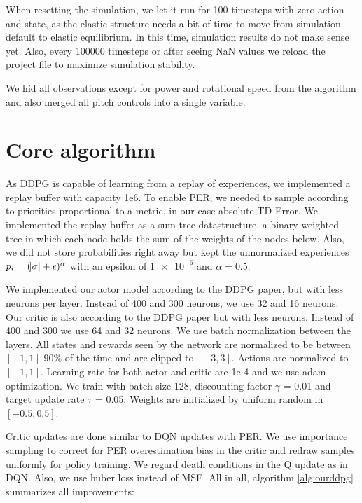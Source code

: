 \documentclass[hyperref,beleg]{cgvpub}
\begin{document}
When resetting the simulation, we let it run for 100 timesteps with zero action and state, as the elastic structure needs a bit of time to move from simulation default to elastic equilibrium. In this time, simulation results do not make sense yet. Also, every 100000 timesteps or after seeing NaN values we reload the project file to maximize simulation stability.

We hid all observations except for power and rotational speed from the algorithm and also merged all pitch controls into a single variable.

\section{Core algorithm}

As DDPG is capable of learning from a replay of experiences, we implemented a replay buffer with capacity 1e6. To enable \ac{PER}, we needed to sample according to priorities proportional to a metric, in our case absolute \ac{TD-Error}. We implemented the replay buffer as a sum tree datastructure, a binary weighted tree in which each node holds the sum of the weights of the nodes below.  Also, we did not store probabilities right away but kept the unnormalized experiences $p_i = (\abs{\sigma} + \epsilon)^{\alpha}$ with an epsilon of $\num{1e-6}$ and $\alpha = 0.5$. 

We implemented our actor model according to the \ac{DDPG} paper, but with less neurons per layer. Instead of 400 and 300 neurons, we use 32 and 16 neurons. Our critic is also according to the \ac{DDPG} paper but with less neurons. Instead of 400 and 300 we use 64 and 32 neurons. We use batch normalization between the layers. All states and rewards seen by the network are normalized to be between $[-1, 1]$ 90\% of the time and are clipped to $[-3, 3]$. Actions are normalized to $[-1, 1]$. Learning rate for both actor and critic are 1e-4 and we use adam optimization. We train with batch size 128, discounting factor $\gamma$ = 0.01 and target update rate $\tau$ = 0.05. Weights are initialized by uniform random in $[-0.5, 0.5]$.

Critic updates are done similar to \ac{DQN} updates with \ac{PER}. We use importance sampling to correct for \ac{PER} overestimation bias in the critic and redraw samples uniformly for policy training. We regard death conditions in the Q update as in \ac{DQN}. Also, we use huber loss instead of MSE. All in all, algorithm \ref{alg:ourddpg} summarizes all improvements:
\end{document}
